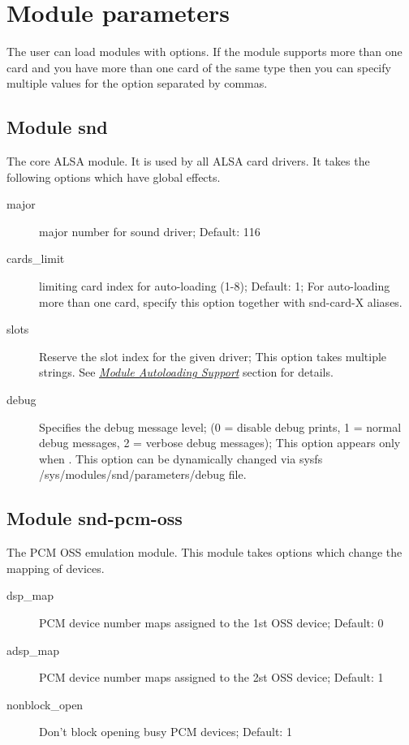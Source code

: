 \documentclass[a4paper,8pt,english]{sphinxmanual}
\begin{document}
\section{Module parameters}
\label{sound/alsa-configuration:module-parameters}
The user can load modules with options. If the module supports more than
one card and you have more than one card of the same type then you can
specify multiple values for the option separated by commas.


\subsection{Module snd}
\label{sound/alsa-configuration:module-snd}
The core ALSA module.  It is used by all ALSA card drivers.
It takes the following options which have global effects.
\begin{description}
\item[{major}] \leavevmode
major number for sound driver;
Default: 116

\item[{cards\_limit}] \leavevmode
limiting card index for auto-loading (1-8);
Default: 1;
For auto-loading more than one card, specify this option
together with snd-card-X aliases.

\item[{slots}] \leavevmode
Reserve the slot index for the given driver;
This option takes multiple strings.
See {\hyperref[sound/alsa\string-configuration:module\string-autoloading\string-support]{\emph{Module Autoloading Support}}} section for details.

\item[{debug}] \leavevmode
Specifies the debug message level;
(0 = disable debug prints, 1 = normal debug messages,
2 = verbose debug messages);
This option appears only when .
This option can be dynamically changed via sysfs
/sys/modules/snd/parameters/debug file.

\end{description}


\subsection{Module snd-pcm-oss}
\label{sound/alsa-configuration:module-snd-pcm-oss}
The PCM OSS emulation module.
This module takes options which change the mapping of devices.
\begin{description}
\item[{dsp\_map}] \leavevmode
PCM device number maps assigned to the 1st OSS device;
Default: 0

\item[{adsp\_map}] \leavevmode
PCM device number maps assigned to the 2st OSS device;
Default: 1

\item[{nonblock\_open}] \leavevmode
Don't block opening busy PCM devices;
Default: 1

\end{description}
\end{document}
